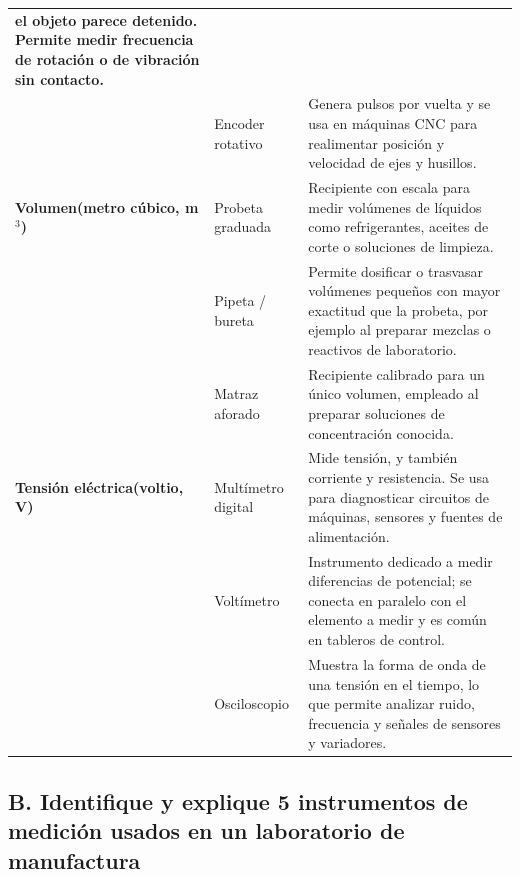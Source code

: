 \documentclass[12pt,a4paper]{article}
\begin{document}
{\begin{longtable}{>{\raggedright\arraybackslash\bfseries}p{2.45cm}
				>{\raggedright\arraybackslash}p{3.3cm}
				>{\raggedright\arraybackslash}p{8.4cm}}
			el objeto parece detenido. Permite medir frecuencia de rotación o de
			vibración
			sin contacto.
			\\
			                                                 & Encoder rotativo
			                                                 & Genera pulsos por
			vuelta y se usa en máquinas CNC para realimentar posición y
			velocidad de ejes y husillos.
			\\
			\rowcolor{lightblue}
			Volumen\newline(metro cúbico, m$^3$)             & Probeta graduada
			                                                 & Recipiente con escala
			para medir volúmenes de líquidos como refrigerantes,
			aceites de corte o soluciones de limpieza.
			\\
			\rowcolor{lightblue}
			                                                 & Pipeta / bureta
			                                                 & Permite dosificar o
			trasvasar volúmenes pequeños con mayor
			exactitud que la probeta, por ejemplo al preparar mezclas o reactivos de
			laboratorio.
			\\
			\rowcolor{lightblue}
			                                                 & Matraz aforado
			                                                 & Recipiente calibrado
			para un único volumen, empleado al preparar soluciones de
			concentración conocida.
			\\
			Tensión eléctrica\newline(voltio, V)             & Multímetro digital
			                                                 & Mide tensión, y también
			corriente y resistencia. Se usa para diagnosticar
			circuitos de máquinas, sensores y fuentes de alimentación.
			\\
			                                                 & Voltímetro
			                                                 & Instrumento dedicado a
			medir diferencias de potencial; se
			conecta en paralelo con el elemento a medir y es común en tableros de
			control.
			\\
			                                                 & Osciloscopio
			                                                 & Muestra la forma de
			onda de una tensión en el tiempo, lo que permite analizar
			ruido, frecuencia y señales de sensores y variadores.
			\\
		\end{longtable}}

\subsection*{B. Identifique y explique 5 instrumentos de medición usados en un
	laboratorio de manufactura}
\end{document}
